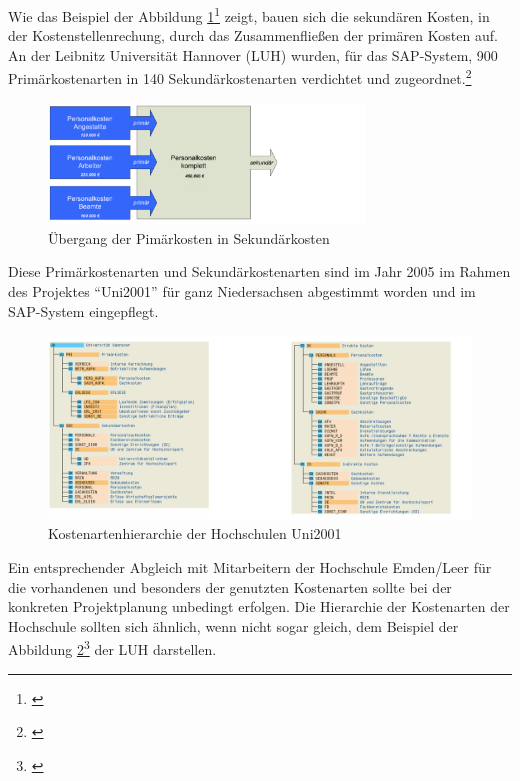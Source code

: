 Wie das Beispiel der Abbildung \ref{fig_uebergang_primaerkosten}\footnote{\autocite[10-11]{pkl_2005}} zeigt, bauen sich die sekundären Kosten, in der Kostenstellenrechung, durch das Zusammenfließen der primären Kosten auf. An der Leibnitz Universität Hannover (LUH) wurden, für das SAP-System, 900 Primärkostenarten in 140 Sekundärkostenarten verdichtet und zugeordnet.\footnote{\autocite[18]{pkl_2005}}

\begin{figure}[htp]
	\centering
	\includegraphics[width=0.75\textwidth]
	{kapitel/gruppe4_2/bilder/uebergang_primaerkosten}
	\caption{Übergang der Pimärkosten in Sekundärkosten}
	\label{fig_uebergang_primaerkosten}
\end{figure}

Diese Primärkostenarten und Sekundärkostenarten sind im Jahr 2005 im Rahmen des Projektes \enquote{Uni2001} für ganz Niedersachsen abgestimmt worden und im SAP-System eingepflegt.

\begin{figure}[h!]
	\centering
	\includegraphics[width=\textwidth]
	{kapitel/gruppe4_2/bilder/kostenartenhierarchie_uni2001}
	\caption{Kostenartenhierarchie der Hochschulen Uni2001}
	\label{fig_kostenartenhierarchie_uni2001}
\end{figure}

Ein entsprechender Abgleich mit Mitarbeitern der Hochschule Emden/Leer für die vorhandenen und besonders der genutzten Kostenarten sollte bei der konkreten Projektplanung unbedingt erfolgen. Die Hierarchie der Kostenarten der Hochschule sollten sich ähnlich, wenn nicht sogar gleich, dem Beispiel der Abbildung \ref{fig_kostenartenhierarchie_uni2001}\footnote{\autocite[21]{pkl_2005}} der LUH darstellen.

\newpage